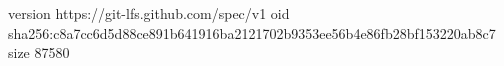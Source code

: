 version https://git-lfs.github.com/spec/v1
oid sha256:c8a7cc6d5d88ce891b641916ba2121702b9353ee56b4e86fb28bf153220ab8c7
size 87580

